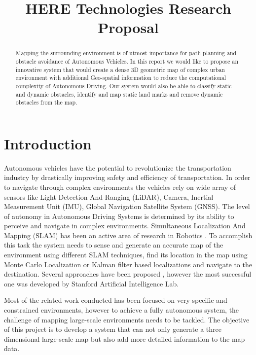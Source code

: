 \documentclass{article}
\title{HERE Technologies Research Proposal}
\begin{document}
	\maketitle
	\newpage
	
	\begin{abstract}
		Mapping the surrounding environment is of utmost importance for path planning and obstacle avoidance of Autonomous Vehicles. In this report we would like to propose an innovative system that would create a dense 3D geometric map of complex urban environment with additional Geo-spatial information to reduce the computational complexity of Autonomous Driving. Our system would also be able to classify static and dynamic obstacles, identify and map static land marks and remove dynamic obstacles from the map.
		
	\end{abstract}
	
	\section{Introduction}
		\paragraph{}
		Autonomous vehicles have the potential to revolutionize the transportation industry by drastically improving safety and efficiency of transportation. In order to navigate through complex environments the vehicles rely on wide array of sensors like Light Detection And Ranging (LiDAR), Camera, Inertial Measurement Unit (IMU), Global Navigation Satellite System (GNSS). The level of autonomy in Autonomous Driving Systems is determined by its ability to perceive and navigate in complex environments. Simultaneous Localization And Mapping (SLAM) has been an active area of research in Robotics
		\cite{durrant-whyte_simultaneous_nodate}
		\cite{bailey_simultaneous_2006}.
		To accomplish this task the system needs to sense and generate an accurate map of the environment using different SLAM techniques, find its location in the map using Monte Carlo Localization
		\cite{thrun_robust_2001}
		or Kalman filter based localizations 
		and navigate to the destination. Several approaches have been proposed 
		\cite{durrant-whyte_simultaneous_nodate}
		\cite{thrun_graph_2006},
		however the most successful one
		\cite{levinson_map-based_2007}
		was developed by Stanford Artificial Intelligence Lab. 
		
		Most of the related work conducted has been focused on very specific and constrained environments, however to achieve a fully autonomous system, the challenge of mapping large-scale environments needs to be tackled. The objective of this project is to develop a system that can not only generate a three dimensional large-scale map but also add more detailed information to the map data.
	
\end{document}
